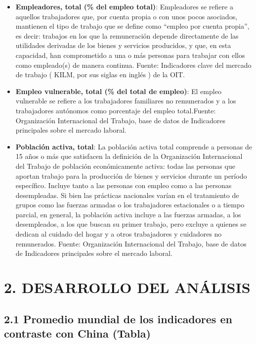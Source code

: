 \documentclass[
]{article}
\begin{document}
\begin{itemize}
\item
  \textbf{Empleadores, total (\% del empleo total)}: Empleadores se
  refiere a aquellos trabajadores que, por cuenta propia o con unos
  pocos asociados, mantienen el tipo de trabajo que se define como
  ``empleo por cuenta propia'', es decir: trabajos en los que la
  remuneración depende directamente de las utilidades derivadas de los
  bienes y servicios producidos, y que, en esta capacidad, han
  comprometido a una o más personas para trabajar con ellos como
  empleado(s) de manera continua. Fuente: Indicadores clave del mercado
  de trabajo ( KILM, por sus siglas en inglés ) de la OIT.
\item
  \textbf{Empleo vulnerable, total (\% del total de empleo)}: El empleo
  vulnerable se refiere a los trabajadores familiares no remunerados y a
  los trabajadores autónomos como porcentaje del empleo total.Fuente:
  Organización Internacional del Trabajo, base de datos de Indicadores
  principales sobre el mercado laboral.
\item
  \textbf{Población activa, total}: La población activa total comprende
  a personas de 15 años o más que satisfacen la definición de la
  Organización Internacional del Trabajo de población económicamente
  activa: todas las personas que aportan trabajo para la producción de
  bienes y servicios durante un período específico. Incluye tanto a las
  personas con empleo como a las personas desempleadas. Si bien las
  prácticas nacionales varían en el tratamiento de grupos como las
  fuerzas armadas o los trabajadores estacionales o a tiempo parcial, en
  general, la población activa incluye a las fuerzas armadas, a los
  desempleados, a los que buscan su primer trabajo, pero excluye a
  quienes se dedican al cuidado del hogar y a otros trabajadores y
  cuidadores no remunerados. Fuente: Organización Internacional del
  Trabajo, base de datos de Indicadores principales sobre el mercado
  laboral.
\end{itemize}

\hypertarget{desarrollo-del-anuxe1lisis}{%
\section{2. DESARROLLO DEL ANÁLISIS}\label{desarrollo-del-anuxe1lisis}}

\hypertarget{promedio-mundial-de-los-indicadores-en-contraste-con-china-tabla}{%
\subsection{2.1 Promedio mundial de los indicadores en contraste con
China
(Tabla)}\label{promedio-mundial-de-los-indicadores-en-contraste-con-china-tabla}}
\end{document}
